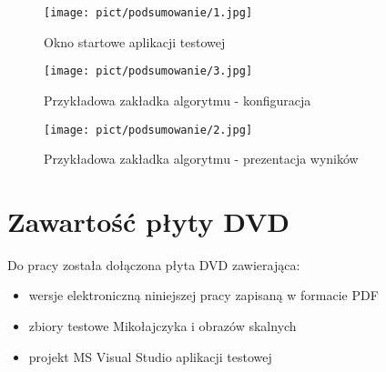 \documentclass[oneside]{mgr}
\begin{document}
\begin{figure}
\centering
\texttt{[image: pict/podsumowanie/1.jpg]}
\caption{Okno startowe aplikacji testowej}
\label{pict:a1}
\end{figure}

\begin{figure}
\centering
\texttt{[image: pict/podsumowanie/3.jpg]}
\caption{Przykładowa zakładka algorytmu - konfiguracja}
\label{pict:a2}
\end{figure}

\begin{figure}
\centering
\texttt{[image: pict/podsumowanie/2.jpg]}
\caption{Przykładowa zakładka algorytmu - prezentacja wyników}
\label{pict:a3}
\end{figure}

\chapter{Zawartość płyty DVD}
Do pracy została dołączona płyta DVD zawierająca:
\begin{itemize}
\item wersje elektroniczną niniejszej pracy zapisaną w formacie PDF
\item zbiory testowe Mikołajczyka i obrazów skalnych
\item projekt MS Visual Studio aplikacji testowej
\end{itemize}






 \listoffigures
 \listoftables
\end{document}
